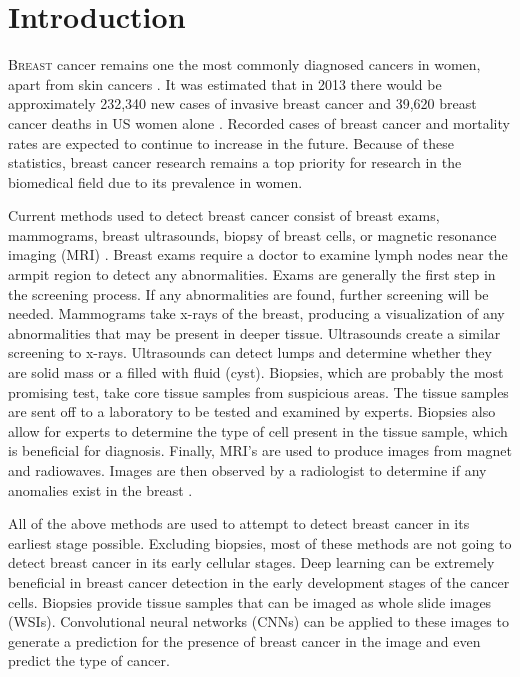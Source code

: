 \documentclass[11pt]{ieeeconf}
\begin{document}
\section{Introduction}
\lettrine{B}{reast} cancer remains one the most commonly diagnosed cancers in women, apart from skin cancers \cite{carol}. It was estimated that in 2013 there would be approximately 232,340 new cases of invasive breast cancer and 39,620 breast cancer deaths in US women alone \cite{carol}. Recorded cases of breast cancer and mortality rates are expected to continue to increase in the future. Because of these statistics, breast cancer research remains a top priority for research in the biomedical field due to its prevalence in women.

Current methods used to detect breast cancer consist of breast exams, mammograms, breast ultrasounds, biopsy of breast cells, or magnetic resonance imaging (MRI) \cite{web2}. Breast exams require a doctor to examine lymph nodes near the armpit region to detect any abnormalities. Exams are generally the first step in the screening process. If any abnormalities are found, further screening will be needed. Mammograms take x-rays of the breast, producing a visualization of  any abnormalities that may be present in deeper tissue. Ultrasounds create a similar screening to x-rays. Ultrasounds can detect lumps and determine whether they are solid mass or a filled with fluid (cyst). Biopsies, which are probably the most promising test, take core tissue samples from suspicious areas. The tissue samples are sent off to a laboratory to be tested and examined by experts. Biopsies also allow for experts to determine the type of cell present in the tissue sample, which is beneficial for diagnosis. Finally, MRI’s are used to produce images from magnet and radiowaves. Images are then observed by a radiologist to determine if any anomalies exist in the breast \cite{web2}.

All of the above methods are used to attempt to detect breast cancer in its earliest stage possible. Excluding biopsies, most of these methods are not going to detect breast cancer in its early cellular stages. Deep learning can be extremely beneficial in breast cancer detection in the early development stages of the cancer cells. Biopsies provide tissue samples that can be imaged as whole slide images (WSIs). Convolutional neural networks (CNNs) can be applied to these images to generate a prediction for the presence of breast cancer in the image and even predict the type of cancer.
\end{document}
